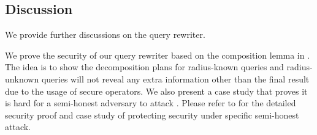 \subsection{Discussion}
\label{sec:discussion}
We provide further discussions on the query rewriter.  

We prove the security of our query rewriter based on the composition lemma in \cite{goldreich2009foundations}. 
The idea is to show the decomposition plans for radius-known queries and radius-unknown queries will not reveal any extra information other than the final result due to the usage of secure operators.
We also present a case study that proves it is hard for a semi-honest adversary to attack \sysname.
Please refer to  for the detailed security proof and case study of protecting security under specific semi-honest attack.



